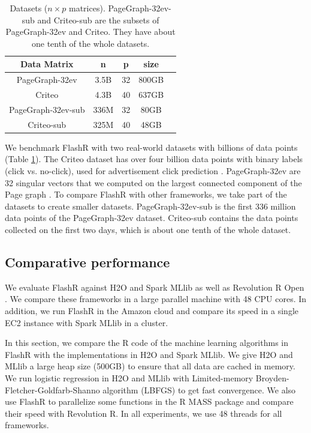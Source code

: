 \begin{table}
\begin{center}
\footnotesize
\begin{tabular}{|c|c|c|c|c|}
\hline
Data Matrix & n & p & size \\
\hline
PageGraph-32ev \cite{webgraph} & 3.5B & 32 & 800GB \\
\hline
Criteo \cite{criteo} & 4.3B & 40 & 637GB \\
\hline
PageGraph-32ev-sub \cite{webgraph} & 336M & 32 & 80GB \\
\hline
Criteo-sub \cite{criteo} & 325M & 40 & 48GB \\
\hline
\end{tabular}
\normalsize
\end{center}
\caption{Datasets ($n \times p$ matrices). PageGraph-32ev-sub and
	Criteo-sub are the subsets of PageGraph-32ev and Criteo. They
	have about one tenth of the whole datasets.}
\label{tbl:data}
\vspace{-5pt}
\end{table}

We benchmark FlashR with two real-world datasets with billions of data points
(Table \ref{tbl:data}). The Criteo dataset has over four billion data points
with binary labels (click vs. no-click), used for advertisement click
prediction \cite{criteo}. PageGraph-32ev are 32 singular vectors that we
computed on the largest connected component of the Page graph \cite{webgraph}.
To compare FlashR with other frameworks, we take part of the datasets to
create smaller datasets. PageGraph-32ev-sub is the first 336 million data points
of the PageGraph-32ev dataset. Criteo-sub contains the data points collected
on the first two days, which is about one tenth of the whole dataset.

\subsection{Comparative performance}
We evaluate FlashR against H2O \cite{h2o} and Spark MLlib \cite{mllib} as well
as Revolution R Open \cite{rro}. We compare these frameworks in a large
parallel machine with 48 CPU cores. In addition, we run FlashR in the Amazon
cloud and compare its speed in a single EC2 instance with Spark MLlib in
a cluster.

In this section, we compare the R code of the machine learning algorithms
in FlashR with the implementations in H2O and Spark MLlib.
We give H2O and MLlib a large heap size (500GB) to ensure that all data are
cached in memory. We run logistic regression in H2O and MLlib with Limited-memory
Broyden-Fletcher-Goldfarb-Shanno algorithm (LBFGS) \cite{lbfgs} to get fast
convergence. We also use FlashR to parallelize some functions in the R
MASS package and compare their speed with Revolution R. In all experiments,
we use 48 threads for all frameworks.

